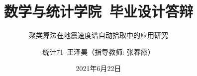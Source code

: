 

\usepackage{longtable}
\usepackage[backend=biber,
style=gb7714-2015, 
gbnamefmt=lowercase, 
maxcitenames=2,
mincitenames=1, 
gbcitelocal=gb7714-2015,
gbpub=false,
doi=false,
isbn=false,
url=false,
eprint=false]{biblatex}

\hypersetup{pdfpagemode=FullScreen}

\usepackage[fontset = none]{ctex}
\setsansfont{Source Han Serif SC}
\usepackage[ruled, boxed, vlined]{algorithm2e}
\usepackage{graphicx}
\usepackage{amsmath}
\usepackage{amsfonts}
\usepackage{subfigure}
\usepackage{url}
\usepackage{caption}
\usepackage{tikz}
\usetikzlibrary{fit,positioning}

\author{统计71~王泽昊（指导教师: 张春霞）}

\date{2021年6月22日}

\title{数学与统计学院~毕业设计答辩}
\subtitle[本科毕业设计]{聚类算法在地震速度谱自动拾取中的应用研究}

\graphicspath{{images/}}

\AtBeginBibliography{\small}
